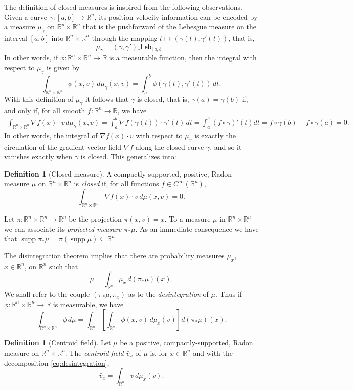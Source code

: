 \documentclass[11pt]{article}
\theoremstyle{definition}
\newtheorem{defn}[thm]{Definition}
\theoremstyle{remark}
\DeclareMathOperator{\supp}{supp}
\newcommand{\R}{\mathbb{R}}
\newcommand{\lebesgue}{\mathsf{Leb}}
\begin{document}
The definition of closed measures is inspired from the following observations. Given a curve $\gamma\colon[a,b]\to\R^n$, its position-velocity information can be encoded by a measure $\mu_\gamma$ on $\R^n\times \R^n$ that is the pushforward of the Lebesgue measure on the interval $[a,b]$ into $\R^n\times\R^n$ through the mapping $t\mapsto (\gamma(t),\gamma'(t))$, that is,
\[\mu_\gamma=(\gamma,\gamma')_*\lebesgue_{[a,b]}.\]
In other words, if $\phi\colon\R^n\times\R^n\to\R$ is a measurable function, then the integral with respect to $\mu_\gamma$ is given by
\[\int_{\R^n\times\R^n}\phi(x,v)\,d\mu_\gamma(x,v)=\int_a^b\phi(\gamma(t),\gamma'(t))\,dt.\]
With this definition of $\mu_\gamma$ it follows that $\gamma$ is closed, that is, $\gamma(a)=\gamma(b)$ if, and only if, for all smooth $f\colon \R^n\to\R$, we have
\begin{multline*}\int_{\R^n\times \R^n}\nabla f(x)\cdot v\,d\mu_\gamma(x,v)=\int_a^b\nabla f(\gamma(t))\cdot\gamma'(t)\,dt %
=
\int_a^b(f\circ\gamma)'(t)dt=f\circ\gamma(b)-f\circ\gamma(a)=0.
\end{multline*}
In other words, the integral of $\nabla f(x)\cdot v$ with respect to $\mu_\gamma$ is exactly the circulation of the gradient vector field $\nabla f$ along the closed curve $\gamma$, and so it vanishes exactly when $\gamma$ is closed. This generalizes into:

\begin{defn}[Closed measure]\label{def:closedmeasure}
 A compactly-supported, positive, Radon measure $\mu$ on $\R^n\times\R^n$ is \emph{closed} if, for all functions $f\in C^\infty(\R^n)$, 
 \[\int_{\R^n\times\R^n}\nabla f(x)\cdot v\,d\mu(x,v)=0.\]
\end{defn}



Let $\pi\colon\R^n\times\R^n\to\R^n$ be the projection $\pi(x,v)=x$. To a measure $\mu$ in $\R^n\times\R^n$ we can associate its \emph{projected measure $\pi_*\mu$}. As an immediate consequence we have that $\supp\pi_*\mu=\pi(\supp\mu)\subseteq\R^n$. 

The disintegration theorem \cite{dellacherie1978probabilities} implies that there are probability measures $\mu_x$, $x\in\R^n$, on $\R^n$ such that
\begin{equation}\label{eq:desintegration}
 \mu=\int_{\R^n}\mu_x\,d(\pi_*\mu)(x). 
\end{equation}
We shall refer to the couple $(\pi_*\mu,\pi_x)$ as to the {\em desintegration} of $\mu$.
Thus if $\phi\colon\R^n\times\R^n\to\R$ is measurable, we have
\[\int_{\R^n\times\R^n}\phi\,d\mu=\int_{\R^n}\left[\int_{\R^n}\phi(x,v)\,d\mu_x(v)\right]d(\pi_*\mu)(x).\]
\begin{defn}[Centroid field]\label{def:centroid}
 Let $\mu$ be a positive, compactly-supported, Radon measure on $\R^n\times\R^n$. The \emph{centroid field $\bar v_x$} of $\mu$ is, for $x\in\R^n$ and with the decomposition \eqref{eq:desintegration},
 \[\bar v_x=\int_{\R^n} v\,d\mu_x(v).\]
\end{defn}
\end{document}
